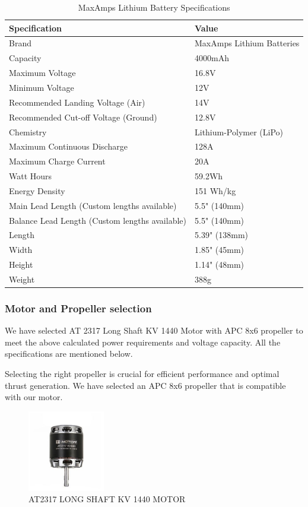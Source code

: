 \documentclass[12 pt]{article}
\begin{document}
\begin{table}[h]
    \centering
    \caption{MaxAmps Lithium Battery Specifications}
    \begin{tabular}{|l|l|}
    \hline
    \textbf{Specification} & \textbf{Value} \\ \hline
    Brand & MaxAmps Lithium Batteries \\
    Capacity & 4000mAh \\
    Maximum Voltage & 16.8V \\
    Minimum Voltage & 12V \\
    Recommended Landing Voltage (Air) & 14V \\
    Recommended Cut-off Voltage (Ground) & 12.8V \\
    Chemistry & Lithium-Polymer (LiPo) \\
    Maximum Continuous Discharge & 128A \\
    Maximum Charge Current & 20A \\
    Watt Hours & 59.2Wh \\
    Energy Density & 151 Wh/kg \\
    Main Lead Length (Custom lengths available) & 5.5" (140mm) \\
    Balance Lead Length (Custom lengths available) & 5.5" (140mm) \\
    Length & 5.39" (138mm) \\
    Width & 1.85" (45mm) \\
    Height & 1.14" (48mm) \\
    Weight & 388g \\ \hline
    \end{tabular}
\end{table}

\subsubsection{Motor and Propeller selection}

We have selected AT 2317 Long Shaft KV 1440 Motor with APC 8x6 propeller to meet the above calculated power requirements and voltage capacity. All the specifications are mentioned below.

Selecting the right propeller is crucial for efficient performance and optimal thrust generation. We have selected an APC 8x6 propeller that is compatible with our motor.

\begin{figure}[h]
    \centering
    \includegraphics[width=0.3\textwidth]{motorr.jpg}
    \caption{AT2317 LONG SHAFT KV 1440 MOTOR}
    \label{fig:motor}
\end{figure}
\end{document}
